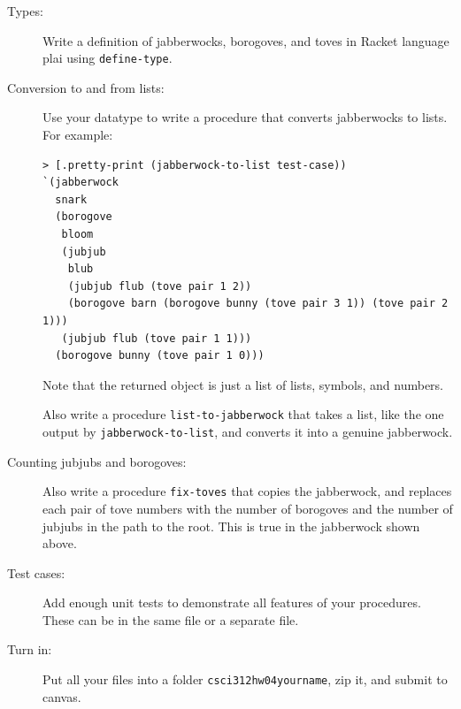 \documentclass{article}
\begin{document}
\begin{description}

\newpage

\item[Types:]
Write a
definition of jabberwocks, borogoves, and toves
 in Racket language plai using {\tt define-type}.  

\item[Conversion to and from lists:]
Use your datatype to write a  procedure that converts
jabberwocks to lists.  For example:
\begin{lstlisting}
> [.pretty-print (jabberwock-to-list test-case))
`(jabberwock
  snark
  (borogove
   bloom
   (jubjub
    blub
    (jubjub flub (tove pair 1 2))
    (borogove barn (borogove bunny (tove pair 3 1)) (tove pair 2 1)))
   (jubjub flub (tove pair 1 1)))
  (borogove bunny (tove pair 1 0)))
\end{lstlisting}
Note that the returned object is just a list of lists, symbols, and numbers.

Also write a procedure {\tt list-to-jabberwock} that takes a list, like the
one output by {\tt jabberwock-to-list}, and converts it into a genuine
jabberwock.

\item[Counting jubjubs and borogoves:]
 Also write a procedure {\tt fix-toves} that copies the
jabberwock, and replaces each pair of tove numbers with 
the number of borogoves and the number of jubjubs in the path
to the root.  This is true in the
jabberwock shown above.

\item[Test cases:]  Add enough unit tests to demonstrate
all features of your procedures.  These can be in the same
file or a separate file.


\item[Turn in:] Put all your files into a folder {\tt csci312hw04yourname},
zip it, and submit to canvas.


\end{description}
\end{document}
